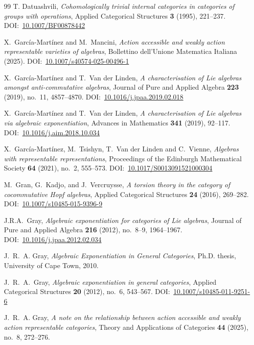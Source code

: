 \documentclass[reqno,hidelinks,a4paper]{amsart}
\renewcommand{\doi}[1]{DOI:~\href{https://doi.org/#1}{#1}}
\theoremstyle{plain}
\theoremstyle{definition}
\theoremstyle{remark}
\numberwithin{equation}{section}
\begin{document}
\begin{thebibliography}{99}
    T. Datuashvili, \emph{Cohomologically trivial internal categories in categories of groups with operations}, Applied Categorical Structures \textbf{3} (1995), 221--237. \doi{10.1007/BF00878442}

    X.~García-Martínez and M.~Mancini, \emph{Action accessible and weakly action representable varieties of algebras}, Bollettino dell'Unione Matematica Italiana (2025). \doi{10.1007/s40574-025-00496-1}

    X.~García-Martínez and T.~Van der Linden, \emph{A characterisation of Lie algebras amongst anti-commutative algebras}, Journal of Pure and Applied Algebra \textbf{223} (2019), no.~11, 4857--4870.  \doi{10.1016/j.jpaa.2019.02.018}

    X.~García-Martínez and T.~Van der Linden, \emph{A characterisation of Lie algebras via algebraic exponentiation}, Advances in Mathematics \textbf{341} (2019), 92--117. \doi{10.1016/j.aim.2018.10.034}

    X.~García-Martínez, M.~Tsishyn, T.~Van der Linden and C.~Vienne, \emph{Algebras with representable representations}, Proceedings of the Edinburgh Mathematical Society \textbf{64} (2021), no.~2, 555--573. \doi{10.1017/S0013091521000304}

    M.~Gran, G.~Kadjo, and J.~Vercruysse, \emph{A torsion theory in the category of cocommutative Hopf algebras}, Applied Categorical Structures \textbf{24} (2016), 269--282. \doi{10.1007/s10485-015-9396-9}

    J.R.A.~Gray, \emph{Algebraic exponentiation for categories of Lie algebras}, Journal of Pure and Applied Algebra \textbf{216} (2012), no.~8--9, 1964--1967. \doi{10.1016/j.jpaa.2012.02.034}

    J.~R.~A. Gray, \emph{Algebraic Exponentiation in General Categories}, Ph.D. thesis, University of Cape Town, 2010.

    J.~R.~A.~Gray, \emph{Algebraic exponentiation in general categories}, Applied Categorical Structures \textbf{20} (2012), no.~6, 543--567. \doi{10.1007/s10485-011-9251-6}

    J.~R.~A. Gray, \emph{A note on the relationship between action accessible and weakly action representable categories}, Theory and Applications of Categories \textbf{44} (2025), no.~8, 272--276.


\end{thebibliography}
\end{document}
